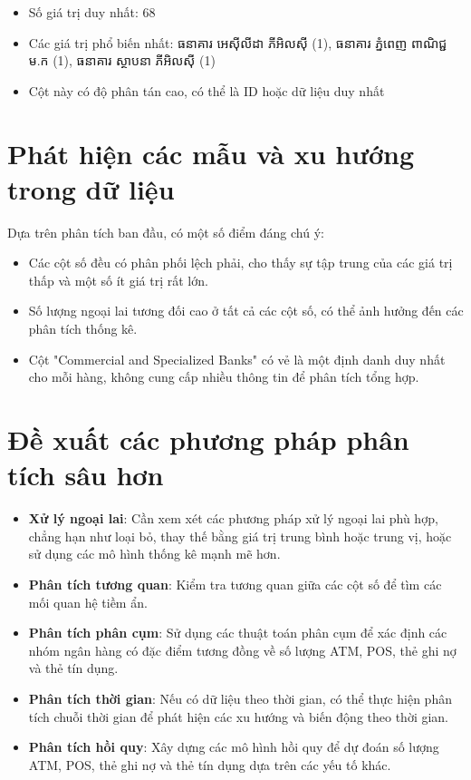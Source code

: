 \documentclass[12pt]{article}
\begin{document}
\begin{itemize}
    \item Số giá trị duy nhất: 68
    \item Các giá trị phổ biến nhất: ធនាគារ អេស៊ីលីដា ភីអិលស៊ី (1), ធនាគារ ភ្នំពេញ ពាណិជ្ជ ម.ក (1), ធនាគារ ស្ថាបនា ភីអិលស៊ី (1)
    \item Cột này có độ phân tán cao, có thể là ID hoặc dữ liệu duy nhất
\end{itemize}

\section{Phát hiện các mẫu và xu hướng trong dữ liệu}

Dựa trên phân tích ban đầu, có một số điểm đáng chú ý:

\begin{itemize}
    \item Các cột số đều có phân phối lệch phải, cho thấy sự tập trung của các giá trị thấp và một số ít giá trị rất lớn.
    \item Số lượng ngoại lai tương đối cao ở tất cả các cột số, có thể ảnh hưởng đến các phân tích thống kê.
    \item Cột "Commercial and Specialized Banks" có vẻ là một định danh duy nhất cho mỗi hàng, không cung cấp nhiều thông tin để phân tích tổng hợp.
\end{itemize}

\section{Đề xuất các phương pháp phân tích sâu hơn}

\begin{itemize}
    \item \textbf{Xử lý ngoại lai}: Cần xem xét các phương pháp xử lý ngoại lai phù hợp, chẳng hạn như loại bỏ, thay thế bằng giá trị trung bình hoặc trung vị, hoặc sử dụng các mô hình thống kê mạnh mẽ hơn.
    \item \textbf{Phân tích tương quan}: Kiểm tra tương quan giữa các cột số để tìm các mối quan hệ tiềm ẩn.
    \item \textbf{Phân tích phân cụm}: Sử dụng các thuật toán phân cụm để xác định các nhóm ngân hàng có đặc điểm tương đồng về số lượng ATM, POS, thẻ ghi nợ và thẻ tín dụng.
    \item \textbf{Phân tích thời gian}: Nếu có dữ liệu theo thời gian, có thể thực hiện phân tích chuỗi thời gian để phát hiện các xu hướng và biến động theo thời gian.
    \item \textbf{Phân tích hồi quy}: Xây dựng các mô hình hồi quy để dự đoán số lượng ATM, POS, thẻ ghi nợ và thẻ tín dụng dựa trên các yếu tố khác.
\end{itemize}
\end{document}
